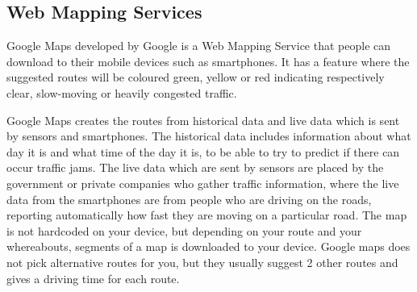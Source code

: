 \subsection*{Web Mapping Services}
%
Google Maps developed by Google is a Web Mapping Service that people can download to their mobile devices such as smartphones. It has a feature where the suggested routes will be coloured green, yellow or red indicating respectively clear, slow-moving or heavily congested traffic.

Google Maps creates the routes from historical data and live data which is sent by sensors and smartphones\cite{Googleabout}. The historical data includes information about what day it is and what time of the day it is, to be able to try to predict if there can occur traffic jams. The live data which are sent by sensors are placed by the government or private companies who gather traffic information, where the live data from the smartphones are from people who are driving on the roads, reporting automatically how fast they are moving on a particular road. The map is not hardcoded on your device, but depending on your route and your whereabouts, segments of a map is downloaded to your device. Google maps does not pick alternative routes for you, but they usually suggest 2 other routes and gives a driving time for each route\cite{NCTA}.


